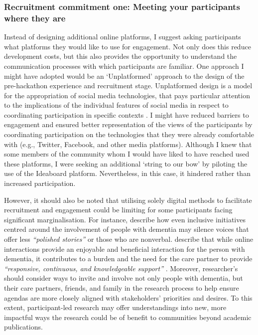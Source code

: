 \subsubsection{Recruitment commitment one: Meeting your participants where they are}
\label{DiscussionTwo:CommitOne}
Instead of designing additional online platforms, I suggest asking participants what platforms they would like to use for engagement. Not only does this reduce development costs, but this also provides the opportunity to understand the communication processes with which participants are familiar. One approach I might have adopted would be an `Unplatformed' approach to the design of the pre-hackathon experience and recruitment stage. Unplatformed design is a model for the appropriation of social media technologies, that pays particular attention to the implications of the individual features of social media in respect to coordinating participation in specific contexts \citep{lambton-howard_unplatformed_2020}. I might have reduced barriers to engagement and ensured better representation of the views of the participants by coordinating participation on the technologies that they were already comfortable with (e.g., Twitter, Facebook, and other media platforms). Although I knew that some members of the community whom I would have liked to have reached used these platforms, I were seeking an additional ‘string to our bow’ by piloting the use of the Ideaboard platform. Nevertheless, in this case, it hindered rather than increased participation. 

However, it should also be noted that utilising solely digital methods to facilitate recruitment and engagement could be limiting for some participants facing significant marginalisation. For instance, \cite{lazar_safe_2019} describe how even inclusive initiatives centred around the involvement of people with dementia may silence voices that offer less \textit{``polished stories''} or those who are nonverbal. \cite{dai2020making} describe that while online interactions provide an enjoyable and beneficial interaction for the person with dementia, it contributes to a burden and the need for the care partner to provide \textit{``responsive, continuous, and knowledgeable support''} \citep[pg.46:24]{hwang2020exploring}. Moreover, researcher's should consider ways to invite and involve not only people with dementia, but their care partners, friends, and family in the research process to help ensure agendas are more closely aligned with stakeholders’ priorities and desires. To this extent, participant-led research may offer understandings into new, more impactful ways the research could be of benefit to communities beyond academic publications.

